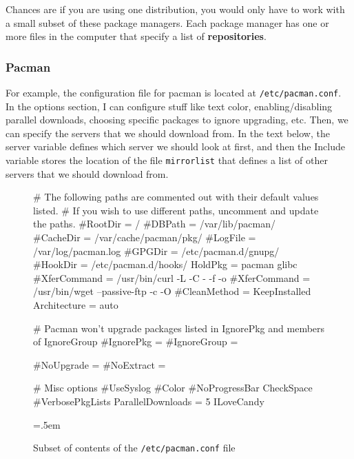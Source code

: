 \documentclass{article}
\newenvironment{cverbatim}
 {\SaveVerbatim{cverb}}
 {\endSaveVerbatim
  \flushleft\fboxrule=0pt\fboxsep=.5em
  \colorbox{cverbbg}{%
    \makebox[\dimexpr\linewidth-2\fboxsep][l]{\BUseVerbatim{cverb}}%
  }
  \endflushleft
}
\begin{document}
    Chances are if you are using one distribution, you would only have to work with a small subset of these package managers. Each package manager has one or more files in the computer that specify a list of \textbf{repositories}. 

    \subsubsection{Pacman}

      For example, the configuration file for pacman is located at \texttt{/etc/pacman.conf}. In the options section, I can configure stuff like text color, enabling/disabling parallel downloads, choosing specific packages to ignore upgrading, etc. Then, we can specify the servers that we should download from. In the text below, the server variable defines which server we should look at first, and then the Include variable stores the location of the file \texttt{mirrorlist} that defines a list of other servers that we should download from. 
      
      \begin{figure}
        \begin{cverbatim} 
          # The following paths are commented out with their default values listed.
          # If you wish to use different paths, uncomment and update the paths.
          #RootDir     = /
          #DBPath      = /var/lib/pacman/
          #CacheDir    = /var/cache/pacman/pkg/
          #LogFile     = /var/log/pacman.log
          #GPGDir      = /etc/pacman.d/gnupg/
          #HookDir     = /etc/pacman.d/hooks/
          HoldPkg     = pacman glibc
          #XferCommand = /usr/bin/curl -L -C - -f -o %
          #XferCommand = /usr/bin/wget --passive-ftp -c -O %
          #CleanMethod = KeepInstalled
          Architecture = auto

          # Pacman won't upgrade packages listed in IgnorePkg and members of IgnoreGroup
          #IgnorePkg   =
          #IgnoreGroup =

          #NoUpgrade   =
          #NoExtract   =

          # Misc options
          #UseSyslog
          #Color
          #NoProgressBar
          CheckSpace
          #VerbosePkgLists
          ParallelDownloads = 5
          ILoveCandy

        \end{cverbatim}
        \caption{Subset of contents of the \texttt{/etc/pacman.conf} file} \label{fig:pacman.conf}
      \end{figure}
      
\end{document}

